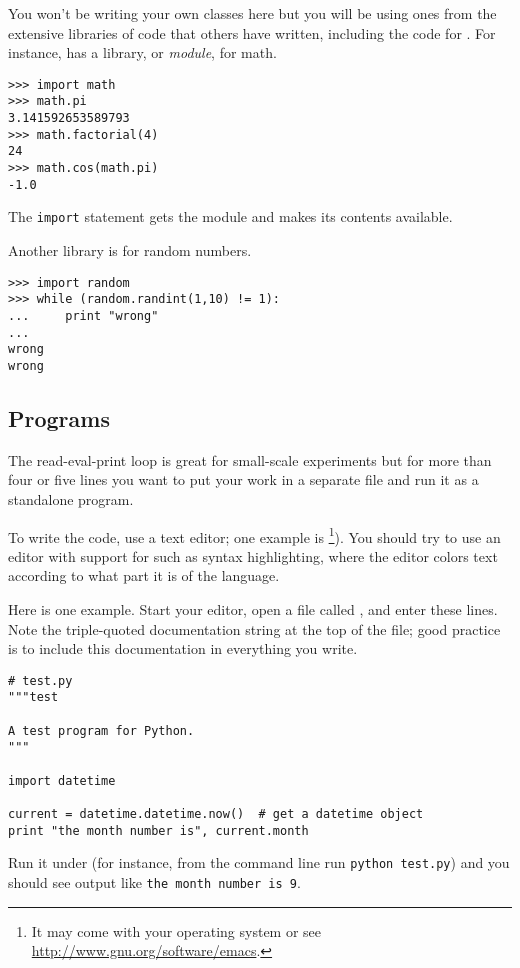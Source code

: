 You won't be writing your own classes here but you will be using ones from
the extensive libraries of code that others have written, including the
code for \Sage. 
For instance, \python{} has a library, or \textit{module}, for math.
\begin{lstlisting}[style=python]
>>> import math
>>> math.pi
3.141592653589793
>>> math.factorial(4)
24
>>> math.cos(math.pi)
-1.0
\end{lstlisting}
The \lstinline[style=inline]!import! statement gets the module and makes
its contents available.

Another library is for random numbers.
\begin{lstlisting}[style=python]
>>> import random
>>> while (random.randint(1,10) != 1):
...     print "wrong"
... 
wrong
wrong
\end{lstlisting}



\subsection{Programs}
The read-eval-print loop is great for small-scale experiments but
for more than four or five lines you 
want to put your work in a separate file and run it as a standalone program.

To write the code, use a text editor; one example is 
\footnote{It may come with your operating system or see \protect\url{http://www.gnu.org/software/emacs}.}).
You should try to use an editor with support for \python{} such as 
syntax highlighting, where the editor colors text according to what part
it is of the language.

Here is one example.
Start your editor, open a file called , and enter these lines.
Note the triple-quoted documentation string at the top of the file; 
good practice is to include this documentation in everything you write.
\begin{lstlisting}[style=python]
# test.py
"""test

A test program for Python. 
"""

import datetime
 
current = datetime.datetime.now()  # get a datetime object
print "the month number is", current.month
\end{lstlisting}
Run it under \python{} (for instance, from the command line
run \lstinline[style=inline]!python test.py!) and you should see
output like \lstinline[style=inline]!the month number is 9!.

